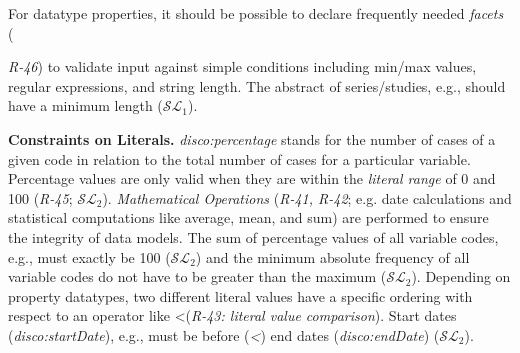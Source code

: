 \documentclass{llncs}
\newenvironment{DL}{
  \vspace{0cm}
  \begin{tabular}{r l}

}{
  \end{tabular}
}
\begin{document}
For datatype properties, it should be possible to declare frequently needed \emph{facets} ({\emph{R-46}) to validate input against simple conditions including min/max values, regular expressions, and string length.
The abstract of series/studies, e.g., should have a minimum length ($\mathcal{SL}_{1}$).

\textbf{Constraints on Literals.}
\emph{disco:percentage} stands for the number of cases of a given code in relation to the total number of cases for a particular variable.
Percentage values are only valid when they are within the \emph{literal range} of 0 and 100 (\emph{R-45}; $\mathcal{SL}_{2}$).
{\em Mathematical Operations} (\emph{R-41, R-42}; e.g. date calculations and statistical computations like average, mean, and sum) are performed to ensure the integrity of data models.
The sum of percentage values of all variable codes, e.g., must exactly be 100 ($\mathcal{SL}_{2}$)
and the minimum absolute frequency of all variable codes do not have to be greater than the maximum ($\mathcal{SL}_{2}$).
Depending on property datatypes, two different literal values have
a specific ordering with respect to an operator like \textless (\emph{R-43: literal value comparison}).
Start dates (\emph{disco:startDate}), e.g., must be before (\emph{\textless}) end dates (\emph{disco:endDate}) ($\mathcal{SL}_{2}$).


%
%

}
\end{document}
